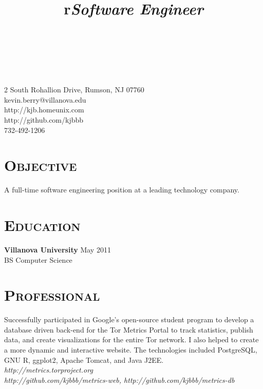 \documentclass[line,margin]{resume}
\begin{document}
\begin{format}
  \title{r}\\
  \\
  \body\\
\end{format}


\begin{resume}
\begin{flushright}
2 South Rohallion Drive, Rumson, NJ 07760 \\
kevin.berry@villanova.edu \\
http://kjb.homeunix.com \\
http://github.com/kjbbb\\
732-492-1206 \\
\end{flushright}

\section{\textsc{Objective}}
A full-time software engineering position at a leading technology company.
\section{\textsc{Education}}

\textbf{Villanova University} \hfill May 2011 \\
BS Computer Science


\section{\textsc{Professional}}

\title{\emph{Software Engineer}}
\begin{position}
Successfully participated in Google's open-source student program to develop a
database driven back-end for the Tor Metrics Portal to track statistics, publish
data, and create visualizations for the entire Tor network. I also helped to
create a more dynamic and interactive website. The technologies included
PostgreSQL, GNU R, ggplot2, Apache Tomcat, and Java J2EE.\\
\emph{http://metrics.torproject.org} \\
\emph{http://github.com/kjbbb/metrics-web, http://github.com/kjbbb/metrics-db}
\end{position}


\end{resume}
\end{document}
